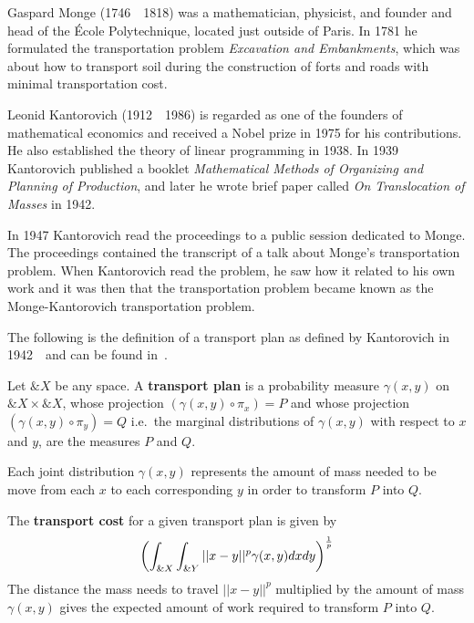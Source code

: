 Gaspard Monge (1746~\textendash~1818) was a mathematician, physicist,
and founder and head of the \'Ecole Polytechnique, located just
outside of Paris. In 1781 he formulated the transportation problem
\textit{Excavation and Embankments}, which was about how to transport
soil during the construction of forts and roads with minimal
transportation cost.

Leonid Kantorovich (1912~\textendash~1986) is regarded as one of the
founders of mathematical economics and received a Nobel prize in 1975
for his contributions.  He also established the theory of linear
programming in 1938. In 1939 Kantorovich published a booklet
\textit{Mathematical Methods of Organizing and Planning of
  Production}, and later he wrote brief paper called \textit{On
  Translocation of Masses} in 1942.

In 1947 Kantorovich read the proceedings to a public session dedicated
to Monge. The proceedings contained the transcript of a talk about
Monge's transportation problem. When Kantorovich read the problem, he
saw how it related to his own work and it was then that the
transportation problem became known as the Monge-Kantorovich
transportation problem.

The following is the definition of a transport plan as defined by
Kantorovich in 1942~\cite{ref:kantorovich-1942}~and can be found
in~\cite{ref:vershik-2013}.

\begin{definition}%
  \label{def:transport-plan}
  Let $\&X$ be any space. A \textbf{transport plan} is a probability
  measure $\gamma(x, y)$ on $\&X \times \&X$, whose projection
  $(\gamma(x, y) \circ \pi_{x}) = P$ and whose projection
  $(\gamma(x, y) \circ \pi_{y}) = Q$ i.e.\ the marginal distributions
  of $\gamma(x, y)$ with respect to $x$ and $y$, are the measures $P$
  and $Q$.
\end{definition}

\begin{remark}%
  \label{rmrk:mass}
  Each joint distribution $\gamma(x, y)$ represents the amount of mass
  needed to be move from each $x$ to each corresponding $y$ in order
  to transform $P$ into $Q$.
\end{remark}

\begin{definition}%
  \label{def:transport-cost}
  The \textbf{transport cost} for a given transport plan is given by
  \begin{align}%
    \label{eq:expected-work}
    \left(\int_{\&X}\int_{\&Y}||x-y||^p\gamma(x, y)dxdy \right)^{1 \over p}
  \end{align}
  The distance the mass needs to travel $||x-y||^p$ multiplied by the
  amount of mass $\gamma(x, y)$ gives the expected amount of work
  required to transform $P$ into $Q$.
\end{definition}

